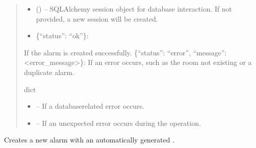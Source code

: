 \documentclass[letterpaper,10pt,english]{sphinxmanual}
\begin{document}
\begin{fulllineitems}
\begin{fulllineitems}
\begin{quote}
\begin{description}
\begin{itemize}
\item {} 
\sphinxAtStartPar
{} (\sphinxstyleliteralemphasis{\sphinxupquote{, }}) – SQLAlchemy session object for database interaction.
If not provided, a new session will be created.

\end{itemize}

\sphinxAtStartPar
\begin{description}
\begin{itemize}
\item {} 
\sphinxAtStartPar
\{“status”: “ok”\}:

\end{itemize}

\sphinxAtStartPar
If the alarm is created successfully.
\sphinxhyphen{} \{“status”: “error”, “message”: <error\_message>\}:
If an error occurs, such as the room not existing or a duplicate alarm.

\end{description}


\sphinxAtStartPar
dict

\begin{itemize}
\item {} 
\sphinxAtStartPar
{} – If a database\sphinxhyphen{}related error occurs.

\item {} 
\sphinxAtStartPar
{} – If an unexpected error occurs during the operation.

\end{itemize}

\end{description}\end{quote}

\end{fulllineitems}


\begin{fulllineitems}
\label{\detokenize{app.controllers:app.controllers.alarm_controller.AlarmController.create_alarmLevel}}
\pysigstartsignatures
\pysiglinewithargsret
{}
{\sphinxparamcomma {}}
{}
\pysigstopsignatures
\sphinxAtStartPar
Creates a new alarm with an automatically generated .


\end{fulllineitems}
\end{fulllineitems}
\end{document}
